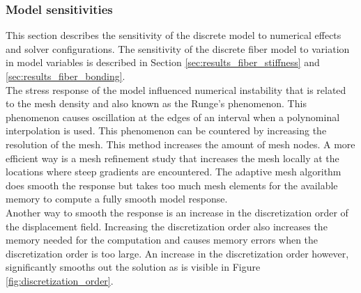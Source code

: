 \subsubsection{Model sensitivities}\label{sec:discrete_model_sensitivities}
This section describes the sensitivity of the discrete model to numerical effects and solver configurations. The sensitivity of the discrete fiber model to variation in model variables is described in Section \ref{sec:results_fiber_stiffness} and \ref{sec:results_fiber_bonding}.\\







\qquad The stress response of the model influenced numerical instability that is related to the mesh density and also known as the Runge's phenomenon. This phenomenon causes oscillation at the edges of an interval when a polynominal interpolation is used. This phenomenon can be countered by increasing the resolution of the mesh. This method increases the amount of mesh nodes. A more efficient way is a mesh refinement study that increases the mesh locally at the locations where steep gradients are encountered. The adaptive mesh algorithm does smooth the response but takes too much mesh elements for the available memory to compute a fully smooth model response.\\

\qquad Another way to smooth the response is an increase in the discretization order of the displacement field. Increasing the discretization order also increases the memory needed for the computation and causes memory errors when the discretization order is too large. An increase in the discretization order however, significantly smooths out the solution as is visible in Figure \ref{fig:discretization_order}.\\

